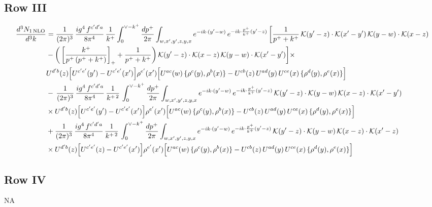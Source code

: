 \documentclass[9pt]{article}
\numberwithin{equation}{section}
\begin{document}
\subsection{Row III}
\begin{align}
\frac{d^{3}N_{1\,\rm NLO}}{d^{3}k} & = \frac{1}{(2\pi)^{3}}\,\frac{ig^{4}\,f^{c'd'a}}{8\pi^{4}}\,\frac{1}{k^{+}}\int_{0}^{\vee-k^{+}}\frac{dp^{+}}{2\pi}\int_{w,x',y',z,y,x}e^{-ik\cdot(y'-w)}\,e^{-ik\cdot\frac{p^{+}}{k^{+}}(y'-z)}\,\bigg[\frac{1}{p^{+}+k^{+}}\,\mathcal{K}(y'-z)\cdot\mathcal{K}(x'-y')\,\mathcal{K}(y-w)\cdot\mathcal{K}(x-z)\notag \\ & -\bigg(\left[\frac{k^{+}}{p^{+}\,(p^{+}+k^{+})}\right]_{+}+\frac{1}{p^{+}+k^{+}}\bigg)\,\mathcal{K}(y'-z)\cdot\mathcal{K}(x-z)\,\mathcal{K}(y-w)\cdot\mathcal{K}(x'-y')\bigg]\times\notag\\
&U^{d'b}(z)\Big[U^{c'e'}(y')-U^{c'e'}(x')\Big]\rho^{e'}(x')\Big[U^{ac}(w)\,\{\rho^{c}(y),\rho^{b}(x)\}-U^{cb}(z)\,U^{ad}(y)\,U^{ce}(x)\,\{\rho^{d}(y),\rho^{e}(x)\}\Big]\notag\\
&-\,\frac{1}{(2\pi)^{3}}\,\frac{ig^{4}\,f^{c'd'a}}{8\pi^{4}}\,\frac{1}{k^{+\,2}}\,\int_{0}^{\vee-k^{+}}\frac{dp^{+}}{2\pi}\int_{w,x',y',z,y,x}e^{-ik\cdot(y'-w)}\,e^{-ik\cdot\frac{p^{+}}{k^{+}}(y'-z)}\,\mathcal{K}(y'-z)\cdot\mathcal{K}(y-w)\,\mathcal{K}(x-z)\cdot\mathcal{K}(x'-y')\notag \\ & \times U^{d'b}(z)\Big[U^{c'e'}(y')-U^{c'e'}(x')\Big]\rho^{e'}(x')\Big[U^{ac}(w)\,\{\rho^{c}(y),\rho^{b}(x)\}-U^{cb}(z)\,U^{ad}(y)\,U^{ce}(x)\,\{\rho^{d}(y),\rho^{e}(x)\}\Big]\notag\\
&+\frac{1}{(2\pi)^{3}}\,\frac{ig^{4}\,f^{c'd'a}}{8\pi^{4}}\,\frac{1}{k^{+\,2}}\,\int_{0}^{\vee-k^{+}}\frac{dp^{+}}{2\pi}\int_{w,x',y',z,y,x}e^{-ik\cdot(y'-w)}\,e^{-ik\cdot\frac{p^{+}}{k^{+}}(y'-z)}\,\mathcal{K}(y'-z)\cdot\mathcal{K}(y-w)\,\mathcal{K}(x-z)\cdot\mathcal{K}(x'-z)\notag \\ & \times U^{d'b}(z)\Big[U^{c'e'}(z)-U^{c'e'}(x')\Big]\rho^{e'}(x')\Big[U^{ac}(w)\,\{\rho^{c}(y),\rho^{b}(x)\}-U^{cb}(z)\,U^{ad}(y)\,U^{ce}(x)\,\{\rho^{d}(y),\rho^{e}(x)\}\Big]
\end{align}
\subsection{Row IV}
\textsc{NA}
\end{document}
